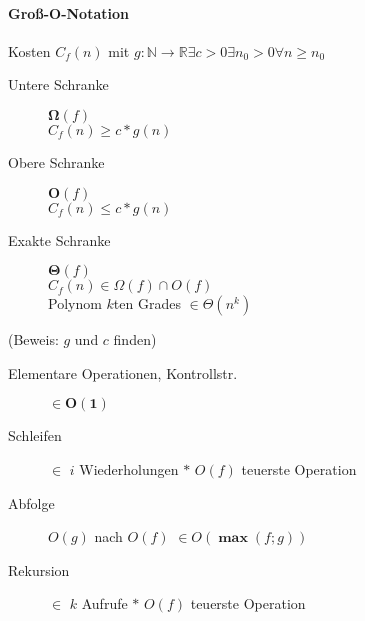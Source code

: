 \documentclass[uniLeipzig]{merkzettel}
\begin{document}
\begin{mzImportant}
  \paragraph{Gro\ss-O-Notation}
  Kosten $C_f(n)$ mit $g: \mathbb{N} \rightarrow \mathbb{R} \exists c > 0 \exists n_0 > 0 \forall n \geq n_0$

  \begin{description}
    \item [Untere Schranke] $\boldsymbol{\Omega} (f)$ \\
          $C_f(n) \boldsymbol{\geq} c * g(n)$

    \item [Obere Schranke] $\boldsymbol{O}(f)$ \\
          $C_f(n) \boldsymbol{\leq} c * g(n)$

    \item [Exakte Schranke] $\boldsymbol{\Theta} (f)$ \\
          $C_f(n) \in \Omega (f) \cap O(f)$ \\
          Polynom $k$ten Grades $\in \Theta (n^k)$
  \end{description}

  (Beweis: $g$ und $c$ finden)
\end{mzImportant}

\begin{mzImportant}
  \begin{description}
    \item [Elementare Operationen, Kontrollstr.]
          $\mathbf{\in O(1)}$

    \item [Schleifen]
          $\in$ $i$ Wiederholungen $\boldsymbol{*}$ $O(f)$ teuerste Operation

    \item [Abfolge]
          $O(g)$ nach $O(f)$ $\in O(\boldsymbol{\max} (f;g))$

    \item [Rekursion]
          $\in$ $k$ Aufrufe $\boldsymbol{*}$ $O(f)$ teuerste Operation
  \end{description}
\end{mzImportant}
\end{document}
